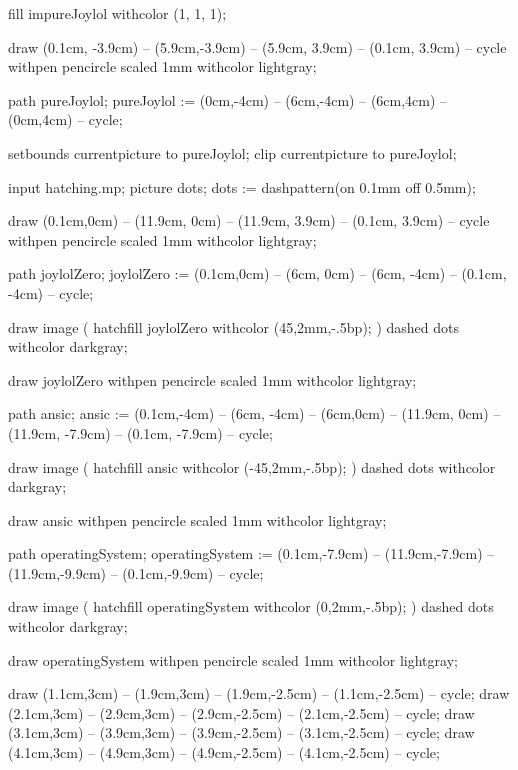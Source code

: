 fill impureJoylol withcolor (1, 1, 1);

draw (0.1cm, -3.9cm) -- (5.9cm,-3.9cm) -- (5.9cm, 3.9cm) -- (0.1cm, 3.9cm) -- cycle
  withpen pencircle scaled 1mm
  withcolor lightgray;
  
path pureJoylol;
pureJoylol := (0cm,-4cm) -- (6cm,-4cm) -- (6cm,4cm) -- (0cm,4cm) -- cycle;

setbounds currentpicture to pureJoylol;
clip currentpicture to pureJoylol;

\stopMPcode\egroup

\bgroup\startMPcode
input hatching.mp;
picture dots; dots := dashpattern(on 0.1mm off 0.5mm);


draw (0.1cm,0cm) -- (11.9cm, 0cm) -- (11.9cm, 3.9cm) -- (0.1cm, 3.9cm) -- cycle
  withpen pencircle scaled 1mm
  withcolor lightgray;

path joylolZero;
joylolZero := (0.1cm,0cm) -- (6cm, 0cm) --
  (6cm, -4cm) -- (0.1cm, -4cm) -- cycle;

draw image (
  hatchfill joylolZero
    withcolor (45,2mm,-.5bp);
) dashed dots withcolor darkgray;

draw joylolZero
  withpen pencircle scaled 1mm
  withcolor lightgray;

path ansic;
ansic := (0.1cm,-4cm) -- (6cm, -4cm) --
     (6cm,0cm) -- (11.9cm, 0cm) -- (11.9cm, -7.9cm) -- (0.1cm, -7.9cm) -- cycle;

draw image (
  hatchfill ansic
    withcolor (-45,2mm,-.5bp);
) dashed dots withcolor darkgray;

draw ansic
  withpen pencircle scaled 1mm
  withcolor lightgray;

path operatingSystem;
operatingSystem := (0.1cm,-7.9cm) -- (11.9cm,-7.9cm) --
  (11.9cm,-9.9cm) -- (0.1cm,-9.9cm) -- cycle;
  
draw image (
  hatchfill operatingSystem
    withcolor (0,2mm,-.5bp);
) dashed dots withcolor darkgray;

draw operatingSystem
  withpen pencircle scaled 1mm
  withcolor lightgray;


draw (1.1cm,3cm) -- (1.9cm,3cm) -- (1.9cm,-2.5cm) -- (1.1cm,-2.5cm) -- cycle;
draw (2.1cm,3cm) -- (2.9cm,3cm) -- (2.9cm,-2.5cm) -- (2.1cm,-2.5cm) -- cycle;
draw (3.1cm,3cm) -- (3.9cm,3cm) -- (3.9cm,-2.5cm) -- (3.1cm,-2.5cm) -- cycle;
draw (4.1cm,3cm) -- (4.9cm,3cm) -- (4.9cm,-2.5cm) -- (4.1cm,-2.5cm) -- cycle;


